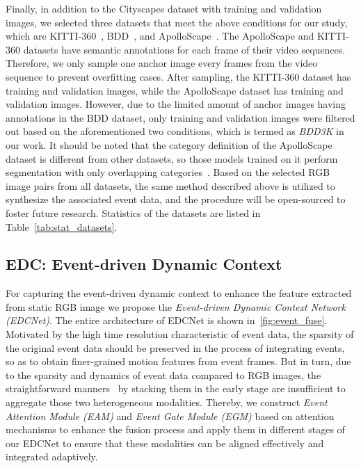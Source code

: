 \documentclass[journal]{IEEEtran}
\begin{document}
Finally, in addition to the Cityscapes dataset with  training and  validation images, we selected three datasets that meet the above conditions for our study, which are KITTI-360~\cite{xie2016semantic}, BDD~\cite{yu2020bdd100k}, and ApolloScape~\cite{wang2019apolloscape}. The ApolloScape and KITTI-360 datasets have semantic annotations for each frame of their video sequences. Therefore, we only sample one anchor image every  frames from the video sequence to prevent overfitting cases. After sampling, the KITTI-360 dataset has  training and  validation images, while the ApolloScape dataset has  training and  validation images. However, due to the limited amount of anchor images having annotations in the BDD dataset, only  training and  validation images were filtered out based on the aforementioned two conditions, which is termed as \textit{BDD3K} in our work. It should be noted that the category definition of the ApolloScape dataset is different from other datasets, so those models trained on it perform segmentation with only  overlapping categories~\cite{wang2019apolloscape}. Based on the selected RGB image pairs from all datasets, the same method described above is utilized to synthesize the associated event data, and the procedure will be open-sourced to foster future research. {Statistics of the datasets are listed in Table~\ref{tab:stat_datasets}}.


\subsection{EDC: Event-driven Dynamic Context}

For capturing the event-driven dynamic context to enhance the feature extracted from static RGB image we propose the \emph{Event-driven Dynamic Context Network (EDCNet)}. The entire architecture of EDCNet is shown in~\cref{fig:event_fuse}. Motivated by the high time resolution characteristic of event data, the sparsity of the original event data should be preserved in the process of integrating events, so as to obtain finer-grained motion features from event frames. But in turn, due to the sparsity and dynamics of event data compared to RGB images, the straightforward manners~\cite{zhu2018ev-flownet}\cite{maqueda2018eventframe_2channel}\cite{alonso2019Ev-SegNet} by stacking them in the early stage are {insufficient} to aggregate those two heterogeneous modalities. Thereby, we construct \emph{Event Attention Module (EAM)} and \emph{Event Gate Module (EGM)} based on attention mechanisms to enhance the fusion process and apply them in different stages of our EDCNet to ensure that these modalities can be aligned effectively and integrated adaptively. 
\end{document}
